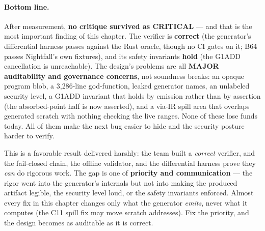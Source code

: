 \paragraph{Bottom line.}
After measurement, \textbf{no critique survived as CRITICAL} ---
and that is the most important finding of this chapter. The
verifier is \textbf{correct} (the generator's differential harness
passes against the Rust oracle, though no CI gates on it; B64 passes
Nightfall's own fixtures), and its safety invariants
\textbf{hold} (the G1ADD cancellation is unreachable). The
design's problems are all \textbf{MAJOR auditability and
governance concerns}, not soundness breaks: an opaque program
blob, a 3{,}286-line god-function, leaked generator names, an
unlabeled security level, a G1ADD invariant that holds by
emission rather than by assertion (the absorbed-point half is now
asserted), and a via-IR spill area that overlaps generated scratch
with nothing checking the live ranges. None of these lose funds
today. All of them make the next bug easier to hide and the
security posture harder to verify.

This is a favorable result delivered harshly: the team built a
\emph{correct} verifier, and the fail-closed chain, the offline
validator, and the differential harness prove they \emph{can} do
rigorous work. The gap is one of \textbf{priority and
communication} --- the rigor went into the generator's internals
but not into making the produced artifact legible, the security
level loud, or the safety invariants enforced. Almost every fix in this
chapter changes only what the generator \emph{emits}, never what
it computes (the C11 spill fix may move scratch addresses). Fix the priority, and the design becomes as
auditable as it is correct.
